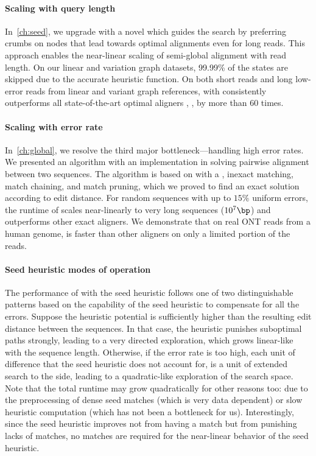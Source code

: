 \paragraph{Scaling with query length}
In~\cref{ch:seed}, we upgrade \astarix with a novel \sh which guides the \A
search by preferring crumbs on nodes that lead towards optimal alignments even
for long reads. This approach enables the near-linear scaling of semi-global
alignment with read length. On our linear and variation graph datasets, 99.99\%
of the states are skipped due to the accurate heuristic function. On both short
reads and long low-error reads from linear and variant graph references, \A with
\sh consistently outperforms all state-of-the-art optimal aligners
\graphaligner, \vargas, \pasgal by more than 60 times.

\paragraph{Scaling with error rate}
In~\cref{ch:global}, we resolve the third major bottleneck---handling high error
rates. We presented an algorithm with an implementation in \astarpa solving
pairwise alignment between two sequences. The algorithm is based on \A with a
\sh, inexact matching, match chaining, and match pruning, which we proved to
find an exact solution according to edit distance. For random sequences with up
to $15\%$ uniform errors, the runtime of \astarpa scales near-linearly to very
long sequences ($10^7\bp$) and outperforms other exact aligners. We demonstrate
that on real ONT reads from a human genome, \astarpa is faster than other
aligners on only a limited portion of the reads.

\paragraph{Seed heuristic modes of operation}
The performance of \A with the seed heuristic follows one of two distinguishable
patterns based on the capability of the seed heuristic to compensate for all the
errors. Suppose the heuristic potential is sufficiently higher than the
resulting edit distance between the sequences. In that case, the heuristic
punishes suboptimal paths strongly, leading to a very directed \A exploration,
which grows linear-like with the sequence length. Otherwise, if the error rate
is too high, each unit of difference that the seed heuristic does not account
for, is a unit of extended search to the side, leading to a quadratic-like
exploration of the search space. Note that the total runtime may grow
quadratically for other reasons too: due to the preprocessing of dense seed
matches (which is very data dependent) or slow heuristic computation (which has
not been a bottleneck for us). Interestingly, since the seed heuristic improves
not from having a match but from punishing lacks of matches, no matches are
required for the near-linear behavior of the seed heuristic.

